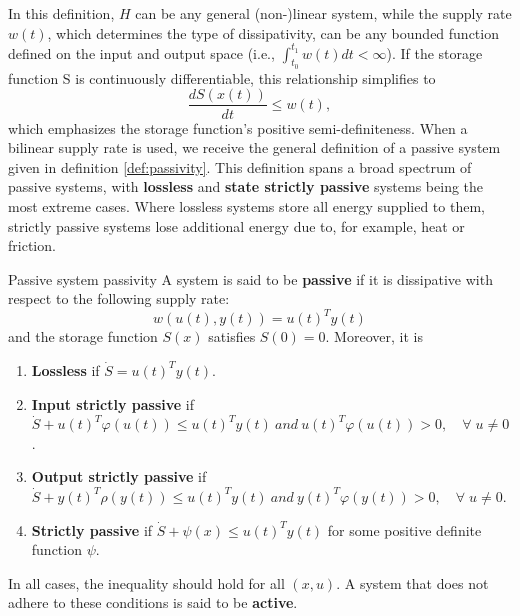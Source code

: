 In this definition, $H$ can be any general (non-)linear system, while the supply rate $w \left( t \right)$, which determines the type of dissipativity, can be any bounded function defined on the input and output space (i.e., $\int_{ t_0 }^{ t_1 } w \left( t \right)dt<\infty$). If the storage function S is continuously differentiable, this relationship simplifies to
\begin{equation}
  \frac{ dS \left( x \left( t \right)\right)}{ dt }\le w \left( t \right),
\end{equation}
which emphasizes the storage function's positive semi-definiteness. When a bilinear supply rate is used, we receive the general definition of a passive system given in definition \ref{def:passivity}. This definition spans a broad spectrum of passive systems, with \textbf{lossless} and \textbf{state strictly passive} systems being the most extreme cases. Where lossless systems store all energy supplied to them, strictly passive systems lose additional energy due to, for example, heat or friction.

\begin{definition}[list text=Passive system,after pre=\footnotetext{Definition 2.7 of \cite{baoProcessControlPassive2007} was combined with a slightly modified version of definition 5.3 of \cite{khalilNonlinearControl2015}.}]{Passive system \cite{khalilNonlinearControl2015, baoProcessControlPassive2007}\footnotemark}{passivity}
  A system is said to be \textbf{passive} if it is dissipative with respect to the following supply rate:
  \begin{equation}
    w \left(u \left(t\right), y \left( t \right)\right)={ u \left( t \right)}^T y \left( t \right)
  \end{equation}
  and the storage function $S \left( x \right)$ satisfies $S \left( 0 \right)= 0$. Moreover, it is
  \begin{enumerate}
    \item \textbf{Lossless} if $\dot{ S }={ u \left( t \right)}^T y \left( t \right)$.
    \item \textbf{Input strictly passive} if $\dot{S} + {u \left(t \right)}^T \varphi \left(u \left(t \right)\right) \le {u \left(t \right)}^T y \left(t \right) \ and \ {u \left( t \right)}^T \varphi \left(u \left( t \right)\right) > 0, \quad \forall \; u \neq 0$.
    \item \textbf{Output strictly passive} if $\dot{S} + {y \left(t \right)}^T \rho \left(y \left(t \right)\right) \le {u \left(t \right)}^T y \left(t \right) \ and \ {y \left( t \right)}^T \varphi \left(y \left(t \right)\right) > 0, \quad \forall \; u \neq 0$.
    \item \textbf{Strictly passive} if $\dot{S} + \psi \left(x \right) \le {u \left(t \right)}^T y \left(t \right)$ for some positive definite function $\psi$.
  \end{enumerate}
  In all cases, the inequality should hold for all $\left(x, u\right)$. A system that does not adhere to these conditions is said to be \textbf{active}.
\end{definition}

